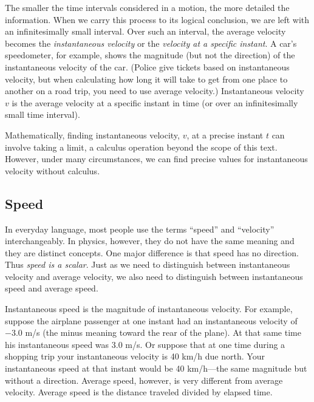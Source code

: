 \documentclass[
]{book}
\begin{document}
The smaller the time intervals considered in a motion, the more detailed
the information. When we carry this process to its logical conclusion,
we are left with an infinitesimally small interval. Over such an
interval, the average velocity becomes the \emph{instantaneous velocity}
\emph{}or the \emph{velocity at a specific instant}.
A car's speedometer, for example, shows the magnitude (but not the
direction) of the instantaneous velocity of the car. (Police give
tickets based on instantaneous velocity, but when calculating how long
it will take to get from one place to another on a road trip, you need
to use average velocity.) \protect\hypertarget{import-auto-id2579029}{}{Instantaneous
velocity} \(v{}\) is the average
velocity at a specific instant in time (or over an infinitesimally small
time interval).

Mathematically, finding instantaneous velocity, \(v{}\), at a precise
instant \(t{}\) can involve taking a limit, a calculus operation beyond
the scope of this text. However, under many circumstances, we can find
precise values for instantaneous velocity without calculus.

\hypertarget{fs-id3597726}{}
\hypertarget{speed}{%
\subsection{Speed}\label{speed}}

In everyday language, most people use the terms ``speed'' and ``velocity''
interchangeably. In physics, however, they do not have the same meaning
and they are distinct concepts. One major difference is that speed has
no direction. Thus \emph{speed is a scalar}. Just as we need to distinguish
between instantaneous velocity and average velocity, we also need to
distinguish between instantaneous speed and average speed.

\protect\hypertarget{import-auto-id2004213}{}{Instantaneous speed} is the
magnitude of instantaneous velocity. For example, suppose the airplane
passenger at one instant had an instantaneous velocity of −3.0 m/s (the
minus meaning toward the rear of the plane). At that same time his
instantaneous speed was 3.0 m/s. Or suppose that at one time during a
shopping trip your instantaneous velocity is 40 km/h due north. Your
instantaneous speed at that instant would be 40 km/h---the same
magnitude but without a direction. Average speed, however, is very
different from average velocity. \protect\hypertarget{import-auto-id2004216}{}{Average speed} is the distance traveled divided by elapsed time.
\end{document}
